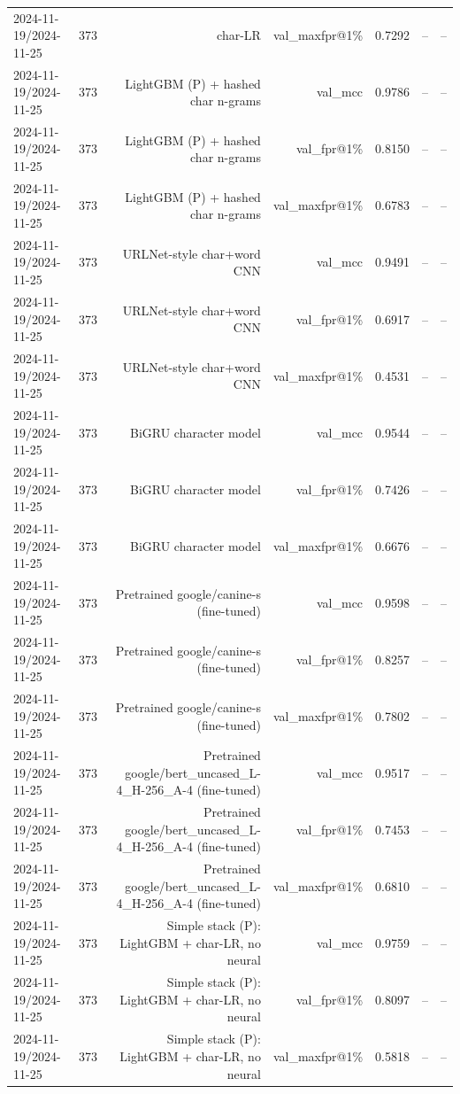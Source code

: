 \begin{table}[t]
\begin{tabular}{llrrrrr}
2024-11-19/2024-11-25 & 373 & char-LR & val\_maxfpr@1\% & 0.7292 & -- & -- \\
2024-11-19/2024-11-25 & 373 & LightGBM (P) + hashed char n-grams & val\_mcc & 0.9786 & -- & -- \\
2024-11-19/2024-11-25 & 373 & LightGBM (P) + hashed char n-grams & val\_fpr@1\% & 0.8150 & -- & -- \\
2024-11-19/2024-11-25 & 373 & LightGBM (P) + hashed char n-grams & val\_maxfpr@1\% & 0.6783 & -- & -- \\
2024-11-19/2024-11-25 & 373 & URLNet-style char+word CNN & val\_mcc & 0.9491 & -- & -- \\
2024-11-19/2024-11-25 & 373 & URLNet-style char+word CNN & val\_fpr@1\% & 0.6917 & -- & -- \\
2024-11-19/2024-11-25 & 373 & URLNet-style char+word CNN & val\_maxfpr@1\% & 0.4531 & -- & -- \\
2024-11-19/2024-11-25 & 373 & BiGRU character model & val\_mcc & 0.9544 & -- & -- \\
2024-11-19/2024-11-25 & 373 & BiGRU character model & val\_fpr@1\% & 0.7426 & -- & -- \\
2024-11-19/2024-11-25 & 373 & BiGRU character model & val\_maxfpr@1\% & 0.6676 & -- & -- \\
2024-11-19/2024-11-25 & 373 & Pretrained google/canine-s (fine-tuned) & val\_mcc & 0.9598 & -- & -- \\
2024-11-19/2024-11-25 & 373 & Pretrained google/canine-s (fine-tuned) & val\_fpr@1\% & 0.8257 & -- & -- \\
2024-11-19/2024-11-25 & 373 & Pretrained google/canine-s (fine-tuned) & val\_maxfpr@1\% & 0.7802 & -- & -- \\
2024-11-19/2024-11-25 & 373 & Pretrained google/bert\_uncased\_L-4\_H-256\_A-4 (fine-tuned) & val\_mcc & 0.9517 & -- & -- \\
2024-11-19/2024-11-25 & 373 & Pretrained google/bert\_uncased\_L-4\_H-256\_A-4 (fine-tuned) & val\_fpr@1\% & 0.7453 & -- & -- \\
2024-11-19/2024-11-25 & 373 & Pretrained google/bert\_uncased\_L-4\_H-256\_A-4 (fine-tuned) & val\_maxfpr@1\% & 0.6810 & -- & -- \\
2024-11-19/2024-11-25 & 373 & Simple stack (P): LightGBM + char-LR, no neural & val\_mcc & 0.9759 & -- & -- \\
2024-11-19/2024-11-25 & 373 & Simple stack (P): LightGBM + char-LR, no neural & val\_fpr@1\% & 0.8097 & -- & -- \\
2024-11-19/2024-11-25 & 373 & Simple stack (P): LightGBM + char-LR, no neural & val\_maxfpr@1\% & 0.5818 & -- & -- \\

\end{tabular}
\end{table}

